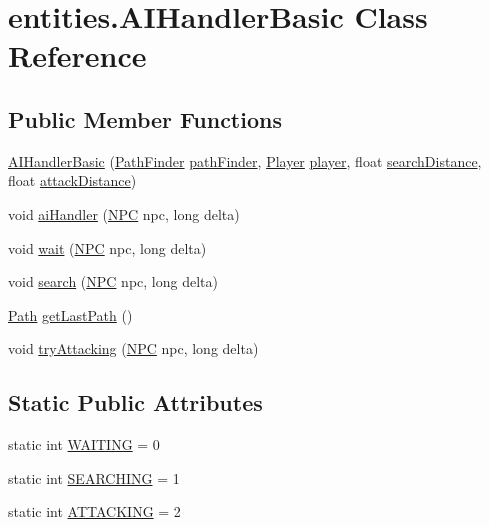 \hypertarget{classentities_1_1_a_i_handler_basic}{}\section{entities.\+A\+I\+Handler\+Basic Class Reference}
\label{classentities_1_1_a_i_handler_basic}
\subsection*{Public Member Functions}
\begin{DoxyCompactItemize}
\item 
\mbox{\hyperlink{classentities_1_1_a_i_handler_basic_a5f3f185b43533fcbc1cd066ee1f7d16a}{A\+I\+Handler\+Basic}} (\mbox{\hyperlink{classentities_1_1_path_finder}{Path\+Finder}} \mbox{\hyperlink{classentities_1_1_a_i_handler_basic_a285a9398062da6b974dc7a2d8e7e630d}{path\+Finder}}, \mbox{\hyperlink{classentities_1_1_player}{Player}} \mbox{\hyperlink{classentities_1_1_a_i_handler_basic_ad7c5aba342053f29862df5f38537bf1c}{player}}, float \mbox{\hyperlink{classentities_1_1_a_i_handler_basic_acb64b3c7941a4f72fd76262280b3e399}{search\+Distance}}, float \mbox{\hyperlink{classentities_1_1_a_i_handler_basic_a3901dfebb437d4f21a074af70d00c940}{attack\+Distance}})
\item 
void \mbox{\hyperlink{classentities_1_1_a_i_handler_basic_ae69789cadb89030804ac4ea2d1971e21}{ai\+Handler}} (\mbox{\hyperlink{classentities_1_1_n_p_c}{N\+PC}} npc, long delta)
\item 
void \mbox{\hyperlink{classentities_1_1_a_i_handler_basic_a5e92ef9a2ad97490bf2cb32bf58be950}{wait}} (\mbox{\hyperlink{classentities_1_1_n_p_c}{N\+PC}} npc, long delta)
\item 
void \mbox{\hyperlink{classentities_1_1_a_i_handler_basic_a3bc305447e74f28a7187b6f2fd80686a}{search}} (\mbox{\hyperlink{classentities_1_1_n_p_c}{N\+PC}} npc, long delta)
\item 
\mbox{\hyperlink{classorg_1_1newdawn_1_1slick_1_1util_1_1pathfinding_1_1_path}{Path}} \mbox{\hyperlink{classentities_1_1_a_i_handler_basic_a65db34fd0393bebc9a92df8f4788b8b4}{get\+Last\+Path}} ()
\item 
void \mbox{\hyperlink{classentities_1_1_a_i_handler_basic_a1f6e2dee1ad5ce70d198dacce17637fc}{try\+Attacking}} (\mbox{\hyperlink{classentities_1_1_n_p_c}{N\+PC}} npc, long delta)
\end{DoxyCompactItemize}
\subsection*{Static Public Attributes}
\begin{DoxyCompactItemize}
\item 
static int \mbox{\hyperlink{classentities_1_1_a_i_handler_basic_a45d0ef8169388da1db65210670398487}{W\+A\+I\+T\+I\+NG}} = 0
\item 
static int \mbox{\hyperlink{classentities_1_1_a_i_handler_basic_ac538f98b8bf642899b6cfe493258f381}{S\+E\+A\+R\+C\+H\+I\+NG}} = 1
\item 
static int \mbox{\hyperlink{classentities_1_1_a_i_handler_basic_a94cae3c413706efe5f714c532515b0cd}{A\+T\+T\+A\+C\+K\+I\+NG}} = 2
\end{DoxyCompactItemize}
